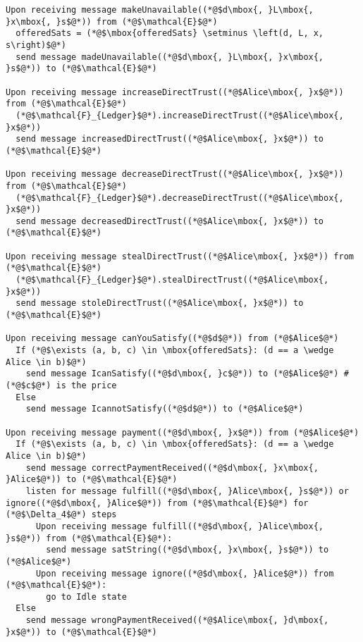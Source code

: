 \begin{lstlisting}[label=protocol, style=numbers]
Upon receiving message makeUnavailable((*@$d\mbox{, }L\mbox{, }x\mbox{, }s$@*)) from (*@$\mathcal{E}$@*)
  offeredSats = (*@$\mbox{offeredSats} \setminus \left(d, L, x, s\right)$@*)
  send message madeUnavailable((*@$d\mbox{, }L\mbox{, }x\mbox{, }s$@*)) to (*@$\mathcal{E}$@*)

Upon receiving message increaseDirectTrust((*@$Alice\mbox{, }x$@*)) from (*@$\mathcal{E}$@*)
  (*@$\mathcal{F}_{Ledger}$@*).increaseDirectTrust((*@$Alice\mbox{, }x$@*))
  send message increasedDirectTrust((*@$Alice\mbox{, }x$@*)) to (*@$\mathcal{E}$@*)

Upon receiving message decreaseDirectTrust((*@$Alice\mbox{, }x$@*)) from (*@$\mathcal{E}$@*)
  (*@$\mathcal{F}_{Ledger}$@*).decreaseDirectTrust((*@$Alice\mbox{, }x$@*))
  send message decreasedDirectTrust((*@$Alice\mbox{, }x$@*)) to (*@$\mathcal{E}$@*)

Upon receiving message stealDirectTrust((*@$Alice\mbox{, }x$@*)) from (*@$\mathcal{E}$@*)
  (*@$\mathcal{F}_{Ledger}$@*).stealDirectTrust((*@$Alice\mbox{, }x$@*))
  send message stoleDirectTrust((*@$Alice\mbox{, }x$@*)) to (*@$\mathcal{E}$@*)

Upon receiving message canYouSatisfy((*@$d$@*)) from (*@$Alice$@*)
  If (*@$\exists (a, b, c) \in \mbox{offeredSats}: (d == a \wedge Alice \in b)$@*)
    send message IcanSatisfy((*@$d\mbox{, }c$@*)) to (*@$Alice$@*) # (*@$c$@*) is the price
  Else
    send message IcannotSatisfy((*@$d$@*)) to (*@$Alice$@*)

Upon receiving message payment((*@$d\mbox{, }x$@*)) from (*@$Alice$@*)
  If (*@$\exists (a, b, c) \in \mbox{offeredSats}: (d == a \wedge Alice \in b)$@*)
    send message correctPaymentReceived((*@$d\mbox{, }x\mbox{, }Alice$@*)) to (*@$\mathcal{E}$@*)
    listen for message fulfill((*@$d\mbox{, }Alice\mbox{, }s$@*)) or ignore((*@$d\mbox{, }Alice$@*)) from (*@$\mathcal{E}$@*) for (*@$\Delta_4$@*) steps
      Upon receiving message fulfill((*@$d\mbox{, }Alice\mbox{, }s$@*)) from (*@$\mathcal{E}$@*):
        send message satString((*@$d\mbox{, }x\mbox{, }s$@*)) to (*@$Alice$@*)
      Upon receiving message ignore((*@$d\mbox{, }Alice$@*)) from (*@$\mathcal{E}$@*):
        go to Idle state
  Else
    send message wrongPaymentReceived((*@$Alice\mbox{, }d\mbox{, }x$@*)) to (*@$\mathcal{E}$@*)
\end{lstlisting}
